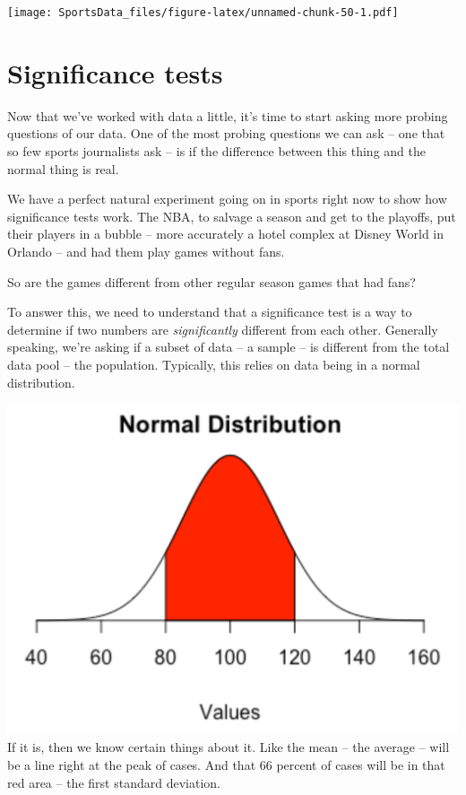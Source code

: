 \documentclass[
]{book}
\begin{document}
\texttt{[image: SportsData\_files/figure-latex/unnamed-chunk-50-1.pdf]}

\hypertarget{significance-tests}{%
\chapter{Significance tests}\label{significance-tests}}

Now that we've worked with data a little, it's time to start asking more probing questions of our data. One of the most probing questions we can ask -- one that so few sports journalists ask -- is if the difference between this thing and the normal thing is real.

We have a perfect natural experiment going on in sports right now to show how significance tests work. The NBA, to salvage a season and get to the playoffs, put their players in a bubble -- more accurately a hotel complex at Disney World in Orlando -- and had them play games without fans.

So are the games different from other regular season games that had fans?

To answer this, we need to understand that a significance test is a way to determine if two numbers are \emph{significantly} different from each other. Generally speaking, we're asking if a subset of data -- a sample -- is different from the total data pool -- the population. Typically, this relies on data being in a normal distribution.

\includegraphics[width=17.64in]{images/simulations2}
If it is, then we know certain things about it. Like the mean -- the average -- will be a line right at the peak of cases. And that 66 percent of cases will be in that red area -- the first standard deviation.
\end{document}
